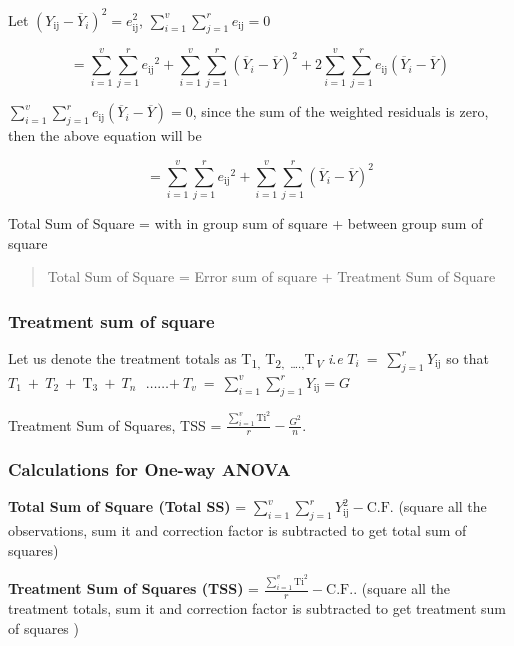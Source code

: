 \documentclass[
]{book}
\begin{document}
Let
\(\left( Y_{\text{ij}} - {\overline{Y}}_{i} \right)^{2} = e_{\text{ij}}^{2}\),
\(\sum_{i = 1}^{v}{\sum_{j = 1}^{r}e_{\text{ij}}} = 0\)

\[= \sum_{i = 1}^{v}{\sum_{j = 1}^{r}{{e_{\text{ij}}}^{2} +}}\sum_{i = 1}^{v}{\sum_{j = 1}^{r}{\left( {\overline{Y}}_{i} - \overline{Y} \right)^{2} + 2\sum_{i = 1}^{v}{\sum_{j = 1}^{r}{e_{\text{ij}}\left( {\overline{Y}}_{i} - \overline{Y} \right)}}}}\]

\(\sum_{i = 1}^{v}{\sum_{j = 1}^{r}{e_{\text{ij}}\left( {\overline{Y}}_{i} - \overline{Y} \right)}} = 0\),
since the sum of the weighted residuals is zero, then the above equation
will be

\[= \sum_{i = 1}^{v}{\sum_{j = 1}^{r}{{e_{\text{ij}}}^{2} +}}\sum_{i = 1}^{v}{\sum_{j = 1}^{r}\left( {\overline{Y}}_{i} - \overline{Y} \right)^{2}}\]

Total Sum of Square = with in group sum of square + between group sum of
square

\begin{quote}
Total Sum of Square = Error sum of square + Treatment Sum of Square
\end{quote}

\hypertarget{treatment-sum-of-square}{%
\subsubsection{Treatment sum of square}\label{treatment-sum-of-square}}

Let us denote the treatment totals as T\textsubscript{1,} T\textsubscript{2,~\ldots.,}T\emph{\textsubscript{V}} \emph{i}.\emph{e} \({T}_{i}{\ =\ }\sum_{j = 1}^{r} Y_{\text{ij}}\) so that
\(T_{1}{\ +\ }{T}_{2}{\ +\ }\text{T}_{3}{\ +\ }{T}_{n}\text{ }\text{……}{+\ }{T}_{v}{\ =\ }\sum_{i = 1}^{v}\sum_{j = 1}^{r} Y_{\text{ij}} = G\)

Treatment Sum of Squares, TSS =
\(\frac{\sum_{i = 1}^{v}\text{T}\text{i}^{2}}{r} - \frac{G^{2}}{n}\).

\hypertarget{oneway}{%
\subsubsection{Calculations for One-way ANOVA}\label{oneway}}

\textbf{Total Sum of Square (Total SS)} = \(\sum_{i = 1}^{v}\sum_{j = 1}^{r} Y_{\text{ij}}^{2} - \text{C.F.}\)
(square all the observations, sum it and correction factor is subtracted to get total sum of squares)

\textbf{Treatment Sum of Squares (TSS)} = \(\frac{\sum_{i = 1}^{v}\text{T}\text{i}^{2}}{r} - \text{C.F.}\).
(square all the treatment totals, sum it and correction factor is subtracted to get treatment sum of squares )
\end{document}
